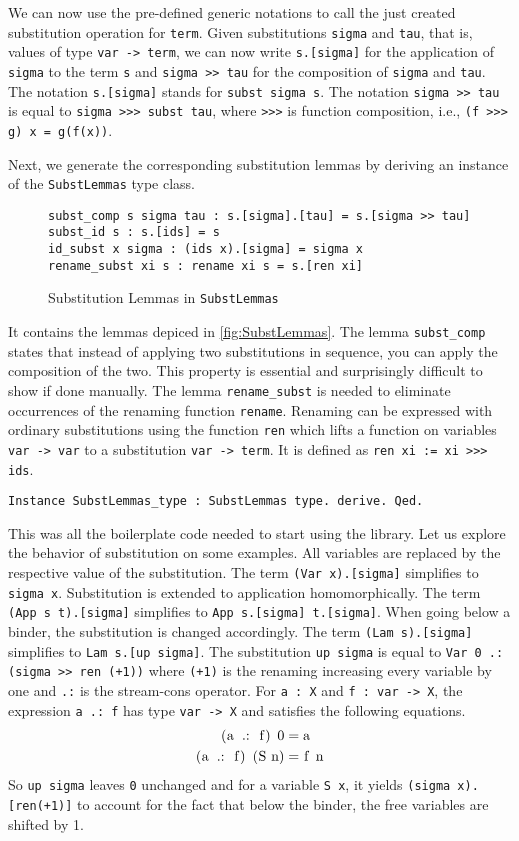 \documentclass{scrartcl}
\newcommand{\lst}{\lstinline}
\begin{document}
We can now use the pre-defined generic notations to call the just created substitution operation for \lst$term$. Given substitutions \lst$sigma$ and \lst$tau$, that is, values of type \lst$var -> term$, we can now write \lst$s.[sigma]$ for the application of \lst$sigma$ to  the term \lst$s$ and \lst$sigma >> tau$ for the composition of \lst$sigma$ and \lst$tau$. 
The notation \lst$s.[sigma]$ stands for \lst$subst sigma s$. 
The notation \lst$sigma >> tau$ is equal to \lst$sigma >>> subst tau$, where \lst$>>>$ is function composition, i.e., \lst$(f >>> g) x = g(f(x))$.

Next, we generate the corresponding substitution lemmas by deriving an instance of the \lst$SubstLemmas$ type class.
\begin{figure}
\begin{lstlisting}
subst_comp s sigma tau : s.[sigma].[tau] = s.[sigma >> tau]
subst_id s : s.[ids] = s
id_subst x sigma : (ids x).[sigma] = sigma x
rename_subst xi s : rename xi s = s.[ren xi]
\end{lstlisting}
  \caption{Substitution Lemmas in \lst$SubstLemmas$}
  \label{fig:SubstLemmas}
\end{figure}
It contains the lemmas depiced in \autoref{fig:SubstLemmas}.
The lemma \lst$subst_comp$ states that instead of applying two substitutions in sequence, you can apply the composition of the two. This property is essential and surprisingly difficult to show if done manually. 
The lemma \lst$rename_subst$ is needed to eliminate occurrences of the renaming function \lst$rename$. Renaming can be expressed with ordinary substitutions using the function \lst$ren$ which lifts a function on variables \lst$var -> var$ to a substitution \lst$var -> term$. It is defined as \lst$ren xi := xi >>> ids$.
\begin{lstlisting}
Instance SubstLemmas_type : SubstLemmas type. derive. Qed.
\end{lstlisting}


This was all the boilerplate code needed to start using the library.
Let us explore the behavior of substitution on some examples.
All variables are replaced by the respective value of the substitution. The term \lst$(Var x).[sigma]$ simplifies to \lst$sigma x$.
Substitution is extended to application homomorphically. 
The term \lst$(App s t).[sigma]$ simplifies to \lst$App s.[sigma] t.[sigma]$.
When going below a binder, the substitution is changed accordingly. 
The term \lst$(Lam s).[sigma]$ simplifies to \lst$Lam s.[up sigma]$. 
The substitution \lst$up sigma$ is equal to \lst$Var 0 .: (sigma >> ren (+1))$ where \lst$(+1)$ is the renaming increasing every variable by one and \lst$.:$ is the stream-cons operator.
For \lst$a : X$ and \lst$f : var -> X$, the expression \lst$a .: f$ has type \lst$var -> X$ and satisfies the following equations.
\begin{align*}
  \text{\lst$(a .: f) 0$} &= \text{\lst$a$} \\
  \text{\lst$(a .: f) (S n)$} &= \text{\lst$f n$}
\end{align*}
So \lst$up sigma$ leaves \lst$0$ unchanged and for a variable \lst$S x$, it yields \lst$(sigma x).[ren(+1)]$ to account for the fact that below the binder, the free variables are shifted by 1.
\end{document}
